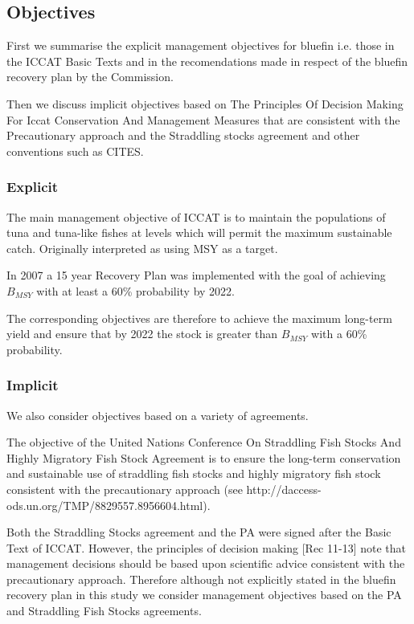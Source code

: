 \documentclass[a4paper,10pt]{article}
\begin{document}
\subsection*{Objectives}

First we summarise the explicit management objectives for bluefin i.e. those in the ICCAT Basic Texts and in the recomendations made 
in respect of the bluefin recovery plan by the Commission.

Then we discuss implicit objectives based on The Principles Of Decision Making For Iccat Conservation And Management Measures
that are consistent with the Precautionary approach and the Straddling stocks agreement and other conventions such as CITES.

\subsubsection*{Explicit}

The main management objective of ICCAT is to maintain the populations of tuna and tuna-like fishes at levels which will permit 
the maximum sustainable catch. Originally interpreted as using MSY as a target.

In 2007 a 15 year Recovery Plan was implemented with the goal of achieving $B_{MSY}$ with at least a 60\% probability by 2022.

The corresponding objectives are therefore to achieve the maximum long-term yield and ensure that by 2022 the stock is
greater than $B_{MSY}$ with a 60\% probability.

\subsubsection*{Implicit}

We also consider objectives based on a variety of agreements.

The objective of the United Nations Conference On Straddling Fish Stocks And Highly Migratory Fish Stock Agreement is to ensure the long-term conservation and
sustainable use of straddling fish stocks and highly migratory fish stock consistent with the precautionary approach (see http://daccess-ods.un.org/TMP/8829557.8956604.html).

Both the Straddling Stocks agreement and the PA were signed after the Basic Text of ICCAT. However, the principles of decision making [Rec 11-13]
note that management decisions should be based upon scientific advice consistent with the precautionary approach. Therefore although not
explicitly stated in the bluefin recovery plan in this study we consider management objectives based on the PA and Straddling Fish Stocks agreements.
\end{document}
